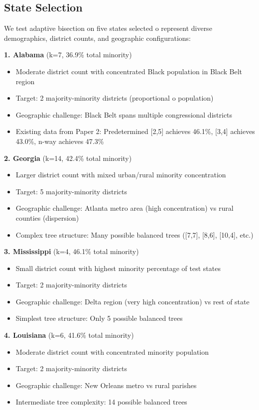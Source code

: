 \subsection{State Selection}

We test adaptive bisection on five states selected 	o represent diverse demographics, district counts, and geographic configurations:

\textbf{1. Alabama} (k=7, 36.9\% total minority)
\begin{itemize}
\item Moderate district count with concentrated Black population in Black Belt region
\item Target: 2 majority-minority districts (proportional 	o population)
\item Geographic challenge: Black Belt spans multiple congressional districts
\item Existing data from Paper 2: Predetermined [2,5] achieves 46.1\%, [3,4] achieves 43.0\%, n-way achieves 47.3\%
\end{itemize}

\textbf{2. Georgia} (k=14, 42.4\% total minority)
\begin{itemize}
\item Larger district count with mixed urban/rural minority concentration
\item Target: 5 majority-minority districts
\item Geographic challenge: Atlanta metro area (high concentration) vs rural counties (dispersion)
\item Complex tree structure: Many possible balanced trees ([7,7], [8,6], [10,4], etc.)
\end{itemize}

\textbf{3. Mississippi} (k=4, 46.1\% total minority)
\begin{itemize}
\item Small district count with highest minority percentage of test states
\item Target: 2 majority-minority districts
\item Geographic challenge: Delta region (very high concentration) vs rest of state
\item Simplest tree structure: Only 5 possible balanced trees
\end{itemize}

\textbf{4. Louisiana} (k=6, 41.6\% total minority)
\begin{itemize}
\item Moderate district count with concentrated minority population
\item Target: 2 majority-minority districts
\item Geographic challenge: New Orleans metro vs rural parishes
\item Intermediate tree complexity: 14 possible balanced trees
\end{itemize}

